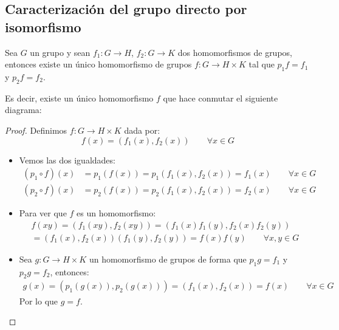 \subsection{Caracterización del grupo directo por isomorfismo}

\begin{teo}\label{teo:prop_universal_directo}
    Sea $G$ un grupo y sean $f_1:G\to H$, $f_2:G\to K$ dos homomorfismos de grupos, entonces existe un único homomorfismo de grupos $f:G\to H\times K$ tal que $p_1f=f_1$ y $p_2f = f_2$. 

    \noindent
    Es decir, existe un único homomorfismo $f$ que hace conmutar el siguiente diagrama:

    \begin{figure}[H]
        \centering
    \end{figure}

    \begin{proof}
        Definimos $f:G\to H\times K$ dada por:
        \begin{equation*}
            f(x) = (f_1(x), f_2(x)) \qquad \forall x\in G
        \end{equation*}
        \begin{itemize}
            \item Vemos las dos igualdades:
                \begin{align*}
                    (p_1\circ f)(x) &= p_1(f(x)) = p_1(f_1(x), f_2(x)) = f_1(x) \qquad \forall x\in G \\
                    (p_2\circ f)(x) &= p_2(f(x)) = p_2(f_1(x), f_2(x)) = f_2(x) \qquad \forall x\in G
                \end{align*}
            \item Para ver que $f$ es un homomorfismo:
                \begin{multline*}
                    f(xy) = (f_1(xy), f_2(xy)) = (f_1(x)f_1(y), f_2(x)f_2(y))  \\ = (f_1(x),f_2(x))(f_1(y),f_2(y)) = f(x)f(y) \qquad \forall x,y\in G
                \end{multline*}
            \item Sea $g:G\to H\times K$ un homomorfismo de grupos de forma que $p_1g = f_1$ y $p_2g=f_2$, entonces:
                \begin{align*}
                    g(x) = (p_1(g(x)), p_2(g(x))) = (f_1(x), f_2(x)) = f(x) \qquad \forall x\in G
                \end{align*}
                Por lo que $g = f$.
        \end{itemize}
    \end{proof}
\end{teo}

